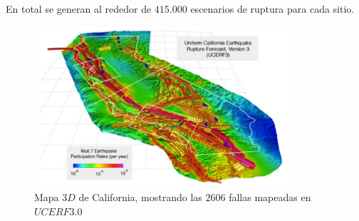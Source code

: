 \documentclass{beamer}
\begin{document}
\begin{frame}[allowframebreaks]
%
En total se generan al rededor de $415.000$ escenarios de ruptura para cada sitio. 
%
%
%
\begin{figure}[h]
	\centering
	\includegraphics[height=6cm]{img/UCERF3_Map.pdf}
	\caption{Mapa $3D$ de California, mostrando las $2606$ fallas mapeadas en $UCERF3.0$ \cite[figura 1, página 5]{ucerf3}}
\end{figure}
%
\end{frame}
%
%
\end{document}

